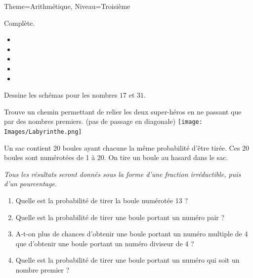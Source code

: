 \documentclass[11pt]{article}
\begin{document}
\begin{multicols}{2}
\begin{Maquette}[Fiche]{Theme=Arithmétique, Niveau=Troisième}
\begin{exercice}
            Complète.
            \begin{itemize}[label={}]
                \item {}
                \item {}
                \item {}
                \item {}
                \item {}
            \end{itemize}
            Dessine les schémas pour les nombres $17$ et $31$.
        \end{exercice}

        \begin{exercice}
            Trouve un chemin permettant de relier les deux super-héros en ne passant que par des nombres premiers. (pas de passage en diagonale)
            \texttt{[image: Images/Labyrinthe.png]}
        \end{exercice}

        \columnbreak

        \begin{exercice}[Source=DNB 2017]
            Un sac contient 20 boules ayant chacune la même probabilité d’être tirée. Ces 20 boules sont numérotées de 1 à 20. On tire un boule au hasard dans le sac.

            \emph{Tous les résultats seront donnés sous la forme d’une fraction irréductible, puis d’un pourcentage.}
            \begin{enumerate}
                \item Quelle est la probabilité de tirer la boule numérotée 13 ?
                \item Quelle est la probabilité de tirer une boule portant un numéro pair ?
                \item A-t-on plus de chances d’obtenir une boule portant un numéro multiple de 4 que d’obtenir une boule portant un numéro diviseur de 4 ?
                \item Quelle est la probabilité de tirer une boule portant un numéro qui soit un nombre premier ?
            \end{enumerate}
        \end{exercice}


\end{Maquette}
\end{multicols}
\end{document}
